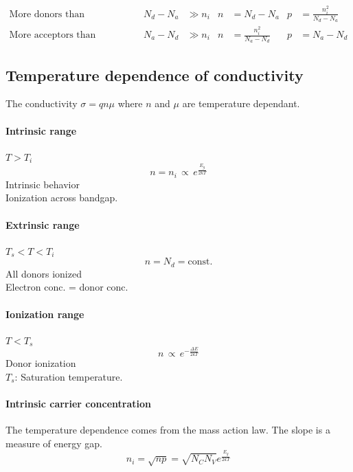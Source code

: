 \begin{align*}
    \text{More donors than acceptors:} && N_d - N_a &\gg n_i & n &= N_d - N_a & p &= \frac{n_i^2}{N_d-N_a} \\
    \text{More acceptors than donors:} && N_a - N_d &\gg n_i & n &= \frac{n_i^2}{N_a - N_d} & p &= N_a - N_d
\end{align*}

\subsection{Temperature dependence of conductivity}
The conductivity $\sigma = q n \mu $ where $n$ and $\mu$ are temperature dependant.

\begin{multicols}{3}
    \paragraph{Intrinsic range}
    $T > T_i$
    \begin{equation*}
        n = n_i \,\propto\, e^{\frac{E_g}{2kT}}
    \end{equation*}
    Intrinsic behavior \\
    Ionization across bandgap.
\vfill\columnbreak
    \paragraph{Extrinsic range}
    $T_s < T < T_i$
    \begin{equation*}
        n = N_d = \text{const.}
    \end{equation*}
    All donors ionized \\
    Electron conc. = donor conc.
\vfill\columnbreak    
    \paragraph{Ionization range}
    $T < T_s$
    \begin{equation*}
        n \,\propto\, e^{-\frac{\Delta E}{2kT}}
    \end{equation*}
    Donor ionization\\
     $T_s$: Saturation temperature.
\vfill
\end{multicols}


\paragraph{Intrinsic carrier concentration}
The temperature dependence comes from the mass action law.
The slope is a measure of energy gap.
\begin{equation}
    n_i = \sqrt{np} = \sqrt{N_C N_V} e^{\frac{E_g}{2kT}}
\end{equation}

